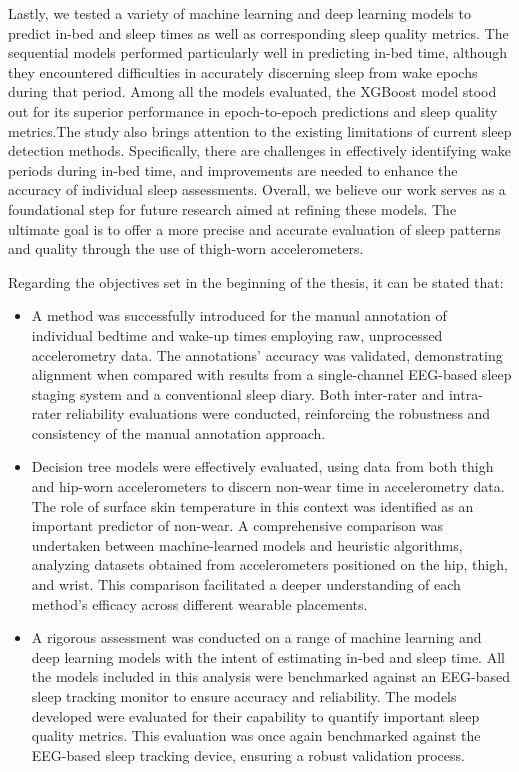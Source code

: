 \documentclass[
  10pt,
]{scrbook}
\begin{document}
Lastly, we tested a variety of machine learning and deep learning models
to predict in-bed and sleep times as well as corresponding sleep quality
metrics. The sequential models performed particularly well in predicting
in-bed time, although they encountered difficulties in accurately
discerning sleep from wake epochs during that period. Among all the
models evaluated, the XGBoost model stood out for its superior
performance in epoch-to-epoch predictions and sleep quality metrics.The
study also brings attention to the existing limitations of current sleep
detection methods. Specifically, there are challenges in effectively
identifying wake periods during in-bed time, and improvements are needed
to enhance the accuracy of individual sleep assessments. Overall, we
believe our work serves as a foundational step for future research aimed
at refining these models. The ultimate goal is to offer a more precise
and accurate evaluation of sleep patterns and quality through the use of
thigh-worn accelerometers.

Regarding the objectives set in the beginning of the thesis, it can be
stated that:

\begin{itemize}
\item
  A method was successfully introduced for the manual annotation of
  individual bedtime and wake-up times employing raw, unprocessed
  accelerometry data. The annotations' accuracy was validated,
  demonstrating alignment when compared with results from a
  single-channel EEG-based sleep staging system and a conventional sleep
  diary. Both inter-rater and intra-rater reliability evaluations were
  conducted, reinforcing the robustness and consistency of the manual
  annotation approach.
\item
  Decision tree models were effectively evaluated, using data from both
  thigh and hip-worn accelerometers to discern non-wear time in
  accelerometry data. The role of surface skin temperature in this
  context was identified as an important predictor of non-wear. A
  comprehensive comparison was undertaken between machine-learned models
  and heuristic algorithms, analyzing datasets obtained from
  accelerometers positioned on the hip, thigh, and wrist. This
  comparison facilitated a deeper understanding of each method's
  efficacy across different wearable placements.
\item
  A rigorous assessment was conducted on a range of machine learning and
  deep learning models with the intent of estimating in-bed and sleep
  time. All the models included in this analysis were benchmarked
  against an EEG-based sleep tracking monitor to ensure accuracy and
  reliability. The models developed were evaluated for their capability
  to quantify important sleep quality metrics. This evaluation was once
  again benchmarked against the EEG-based sleep tracking device,
  ensuring a robust validation process.
\end{itemize}
\end{document}
